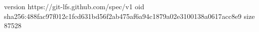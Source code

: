 version https://git-lfs.github.com/spec/v1
oid sha256:488fac97f012c1fcd631bd56f2ab475af6a94c1879a02e3100138a0617acc8e9
size 87528
